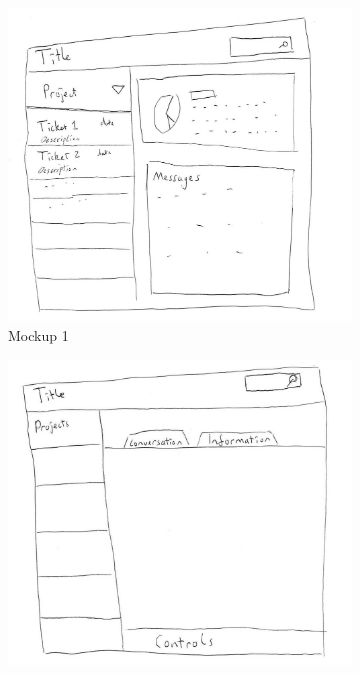 \documentclass[a4paper]{l3proj}
\begin{document}
\begin{figure}
    \centering
    \begin{subfigure}[b]{0.3\textwidth}
	    \centering
		\includegraphics[width=\textwidth]{mockup1}
		\caption{Mockup 1}
		\label{fig:mockup1}        
    \end{subfigure}
    \hfill
    \begin{subfigure}[b]{0.3\textwidth}
        \centering
		\includegraphics[width=\textwidth]{mockup2}

\end{subfigure}
\end{figure}
\end{document}
